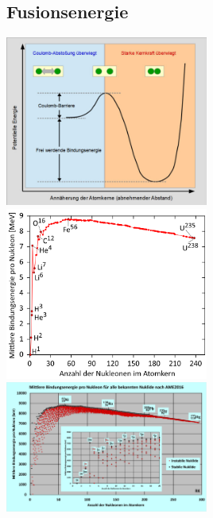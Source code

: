 \documentclass{article}
\begin{document}
        \subsection{Fusionsenergie}
        \includegraphics[width=0.5\textwidth]{graphics/potentielleKernenergie.jpg} \\
        \includegraphics[width=0.5\textwidth]{graphics/bindungsEnergie.png}
        \includegraphics[width=0.5\textwidth]{graphics/bindungsEnergie_big.png} \\
\end{document}
